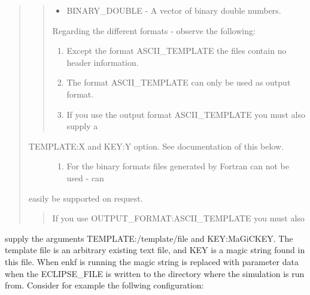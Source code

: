 \documentclass[letterpaper,10pt,english]{sphinxmanual}
\begin{document}
\begin{sphinxShadowBox}
\begin{quote}
\begin{description}
\begin{quote}
\begin{itemize}
\item {} 
BINARY\_DOUBLE - A vector of binary double numbers.

\end{itemize}

Regarding the different formats - observe the following:
\begin{enumerate}
\item {} 
Except the format ASCII\_TEMPLATE the files contain no header information.

\item {} 
The format ASCII\_TEMPLATE can only be used as output format.

\item {} 
If you use the output format ASCII\_TEMPLATE you must also supply a

\end{enumerate}
\end{quote}
\begin{description}
\item[{TEMPLATE:X and KEY:Y option. See documentation of this below.}] \leavevmode\begin{enumerate}
\item {} 
For the binary formats files generated by Fortran can not be used - can

\end{enumerate}

\end{description}

easily be supported on request.
\begin{quote}

 If you use OUTPUT\_FORMAT:ASCII\_TEMPLATE you must also
\end{quote}

\end{description}
\end{quote}

supply the arguments TEMPLATE:/template/file and KEY:MaGiCKEY. The template
file is an arbitrary existing text file, and KEY is a magic string found in
this file. When enkf is running the magic string is replaced with parameter
data when the ECLIPSE\_FILE is written to the directory where the simulation
is run from. Consider for example the follwing configuration:
\begin{quote}

%
\begin{sphinxVerbatim}[commandchars=\\\{\}]
   
\end{sphinxVerbatim}


\end{quote}
\end{sphinxShadowBox}
\end{document}
